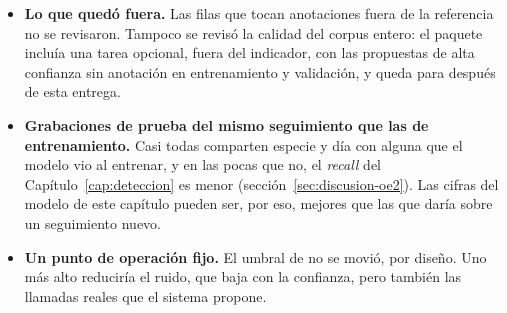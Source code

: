 \begin{itemize}
          se miden contra ella, heredan esos errores.
    \item \textbf{Lo que quedó fuera.} Las \uNotReviewed{} filas que tocan
          anotaciones fuera de la referencia no se revisaron. Tampoco se revisó
          la calidad del corpus entero: el paquete incluía una tarea opcional, fuera
          del indicador, con las propuestas de alta confianza sin anotación en
          entrenamiento y validación, y queda para después de esta entrega.
    \item \textbf{Grabaciones de prueba del mismo seguimiento que las de
              entrenamiento.} Casi todas comparten especie y día con alguna que el
          modelo vio al entrenar, y en las pocas que no, el \textit{recall} del
          Capítulo~\ref{cap:deteccion} es menor (sección~\ref{sec:discusion-oe2}).
          Las cifras del modelo de este capítulo pueden ser, por eso, mejores que
          las que daría sobre un seguimiento nuevo.
    \item \textbf{Un punto de operación fijo.} El umbral de \rThresholdYol{} no se
          movió, por diseño. Uno más alto reduciría el ruido, que baja con la
          confianza, pero también las llamadas reales que el sistema propone.
\end{itemize}
